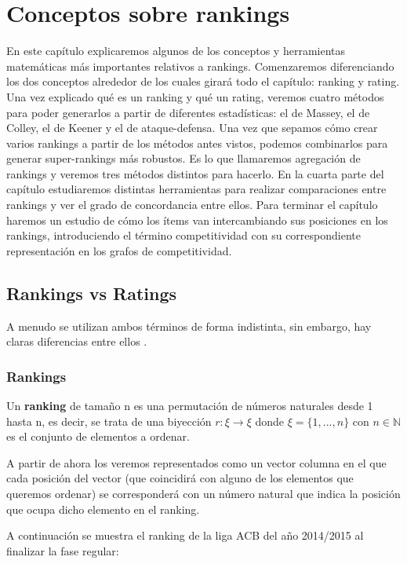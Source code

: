 \chapter{Conceptos sobre rankings}
En este capítulo explicaremos algunos de los conceptos y herramientas matemáticas más importantes relativos a rankings. Comenzaremos diferenciando los dos conceptos alrededor de los cuales girará todo el capítulo: ranking y rating. Una vez explicado qué es un ranking y qué un rating, veremos cuatro métodos para poder generarlos a partir de diferentes estadísticas: el de Massey, el de Colley, el de Keener y el de ataque-defensa. Una vez que sepamos cómo crear varios rankings a partir de los métodos antes vistos, podemos combinarlos para generar super-rankings más robustos. Es lo que llamaremos agregación de rankings y veremos tres métodos distintos para hacerlo. En la cuarta parte del capítulo estudiaremos distintas herramientas para realizar comparaciones entre rankings y ver el grado de concordancia entre ellos. Para terminar el capítulo haremos un estudio de cómo los ítems van intercambiando sus posiciones en los rankings, introduciendo el término competitividad con su correspondiente representación en los grafos de competitividad. 

\section{Rankings vs Ratings}
A menudo se utilizan ambos términos de forma indistinta, sin embargo, hay claras diferencias entre ellos \cite[Chapter 1]{libro_rankings}.

\subsection{Rankings}
\begin{defi} 
	Un \textbf{ranking} de tamaño n es una permutación de números naturales desde 1 hasta n, es decir, se trata de una biyección $r: \xi \rightarrow \xi$ donde $\xi = \{1,...,n\}$ con $n \in \mathbb{N}$ es el conjunto de elementos a ordenar.
\end{defi}
A partir de ahora los veremos representados como un vector columna en el que cada posición del vector (que coincidirá con alguno de los elementos que queremos ordenar) se corresponderá con un número natural que indica la posición que ocupa dicho elemento en el ranking. 
 
\newpage 
 
\begin{ejem} \label{ejem1}
A continuación se muestra el ranking de la liga ACB del año 2014/2015 al finalizar la fase regular:
\end{ejem}
	
